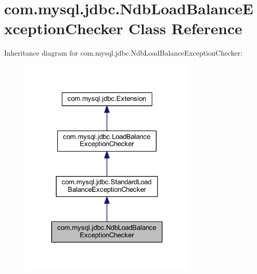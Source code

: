 \hypertarget{classcom_1_1mysql_1_1jdbc_1_1_ndb_load_balance_exception_checker}{}\section{com.\+mysql.\+jdbc.\+Ndb\+Load\+Balance\+Exception\+Checker Class Reference}
\label{classcom_1_1mysql_1_1jdbc_1_1_ndb_load_balance_exception_checker}


Inheritance diagram for com.\+mysql.\+jdbc.\+Ndb\+Load\+Balance\+Exception\+Checker\+:
\nopagebreak
\begin{figure}[H]
\begin{center}
\leavevmode
\includegraphics[width=242pt]{classcom_1_1mysql_1_1jdbc_1_1_ndb_load_balance_exception_checker__inherit__graph}
\end{center}
\end{figure}


